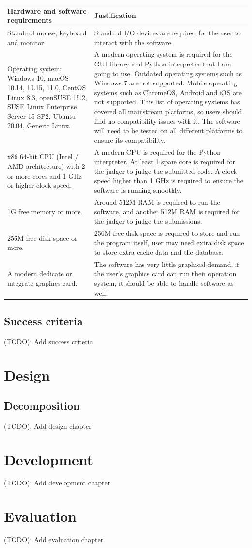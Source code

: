 \documentclass[a4paper]{report}
\begin{document}
\begin{tabulary}{\linewidth}{|L|L|}
    \hline
    Hardware and software requirements & Justification \\
    \hline
    Standard mouse, keyboard and monitor. & Standard I/O devices are required for the user to interact with the software. \\
    \hline
    Operating system: Windows 10, macOS 10.14, 10.15, 11.0, CentOS Linux 8.3, openSUSE 15.2, SUSE Linux Enterprise Server 15 SP2, Ubuntu 20.04, Generic Linux. & A modern operating system is required for the GUI library and Python interpreter that I am going to use. Outdated operating systems such as Windows 7 are not supported. Mobile operating systems such as ChromeOS, Android and iOS are not supported. This list of operating systems has covered all mainstream platforms, so users should find no compatibility issues with it. The software will need to be tested on all different platforms to ensure its compatibility. \\
    \hline
    x86 64-bit CPU (Intel / AMD architecture) with 2 or more cores and 1 GHz or higher clock speed. & A modern CPU is required for the Python interpreter. At least 1 spare core is required for the judger to judge the submitted code. A clock speed higher than 1 GHz is required to ensure the software is running smoothly. \\
    \hline
    1G free memory or more. & Around 512M RAM is required to run the software, and another 512M RAM is required for the judger to judge the submissions. \\
    \hline
    256M free disk space or more. & 256M free disk space is required to store and run the program itself, user may need extra disk space to store extra cache data and the database. \\
    \hline
    A modern dedicate or integrate graphics card. & The software has very little graphical demand, if the user's graphics card can run their operation system, it should be able to handle software as well. \\
    \hline
\end{tabulary}

\section{Success criteria}

(TODO): Add success criteria

\chapter{Design}

\section{Decomposition}

(TODO): Add design chapter

\chapter{Development}

(TODO): Add development chapter

\chapter{Evaluation}

(TODO): Add evaluation chapter
\end{document}
